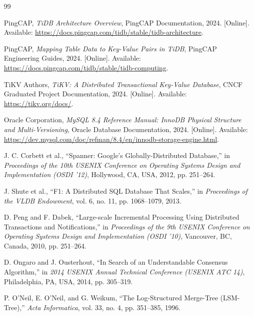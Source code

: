 
\clearpage
{}
{}
\begin{thebibliography}{99}

PingCAP, \textit{TiDB Architecture Overview}, PingCAP Documentation, 2024. [Online]. Available: \url{https://docs.pingcap.com/tidb/stable/tidb-architecture}.

PingCAP, \textit{Mapping Table Data to Key-Value Pairs in TiDB}, PingCAP Engineering Guides, 2024. [Online]. Available: \url{https://docs.pingcap.com/tidb/stable/tidb-computing}.

TiKV Authors, \textit{TiKV: A Distributed Transactional Key-Value Database}, CNCF Graduated Project Documentation, 2024. [Online]. Available: \url{https://tikv.org/docs/}.

Oracle Corporation, \textit{MySQL 8.4 Reference Manual: InnoDB Physical Structure and Multi-Versioning}, Oracle Database Documentation, 2024. [Online]. Available: \url{https://dev.mysql.com/doc/refman/8.4/en/innodb-storage-engine.html}.

J. C. Corbett et al., ``Spanner: Google's Globally-Distributed Database,'' in \textit{Proceedings of the 10th USENIX Conference on Operating Systems Design and Implementation (OSDI '12)}, Hollywood, CA, USA, 2012, pp. 251--264.

J. Shute et al., ``F1: A Distributed SQL Database That Scales,'' in \textit{Proceedings of the VLDB Endowment}, vol. 6, no. 11, pp. 1068--1079, 2013.

D. Peng and F. Dabek, ``Large-scale Incremental Processing Using Distributed Transactions and Notifications,'' in \textit{Proceedings of the 9th USENIX Conference on Operating Systems Design and Implementation (OSDI '10)}, Vancouver, BC, Canada, 2010, pp. 251--264.

D. Ongaro and J. Ousterhout, ``In Search of an Understandable Consensus Algorithm,'' in \textit{2014 USENIX Annual Technical Conference (USENIX ATC 14)}, Philadelphia, PA, USA, 2014, pp. 305--319.

P. O'Neil, E. O'Neil, and G. Weikum, ``The Log-Structured Merge-Tree (LSM-Tree),'' \textit{Acta Informatica}, vol. 33, no. 4, pp. 351--385, 1996.


\end{thebibliography}

